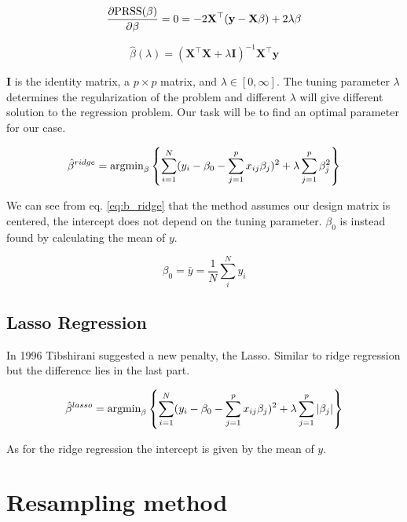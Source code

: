 \documentclass[a4paper,12pt, english]{article}
\begin{document}
\begin{equation}
\frac{\partial \textnormal{PRSS}(\beta)}{\partial \beta} = 0 = -2 \mathbf{X}^{\top}(\mathbf{y} - \mathbf{X}\beta) + 2 \lambda \beta
\end{equation}

\begin{equation} \label{eq:beta}
\hat{\beta}(\lambda) = (\mathbf{X}^{\top}\mathbf{X} + \lambda\mathbf{I})^{-1}\mathbf{X}^{\top}\mathbf{y}
\end{equation}

$\mathbf{I}$ is the identity matrix, a $p \times p$ matrix, and $\lambda \in [0, \infty]$. The tuning parameter $\lambda$ determines the regularization of the problem and different $\lambda$ will give different solution to the regression problem. Our task will be to find an optimal parameter for our case.

\begin{equation} \label{eq:b_ridge}
\hat{\beta}^{ridge} = \textnormal{argmin}_{\beta} \left \{ \sum_{i=1}^{N} (y_i - \beta_0 - \sum_{j=1}^{p} x_{ij} \beta_j)^2 + \lambda \sum_{j=1}^{p} \beta_j^2 \right \}
\end{equation}

We can see from eq. \ref{eq:b_ridge} that the method assumes our design matrix is centered, the intercept does not depend on the tuning parameter. $\beta_0$ is instead found by calculating the mean of $y$.

\begin{equation} \label{y_mean}
\beta_0 = \bar{y} = \frac{1}{N} \sum_i^N y_i
\end{equation}

\subsection*{Lasso Regression}

In 1996 Tibshirani suggested a new penalty, the Lasso. Similar to ridge regression but the difference lies in the last part.  

\begin{equation}
\hat{\beta}^{lasso} = \textnormal{argmin}_{\beta} \left \{ \sum_{i=1}^{N} (y_i - \beta_0 - \sum_{j=1}^{p} x_{ij} \beta_j)^2 + \lambda \sum_{j=1}^{p} |\beta_j| \right \}
\end{equation}

As for the ridge regression the intercept is given by the mean of $y$.

\section*{Resampling method}
\end{document}

